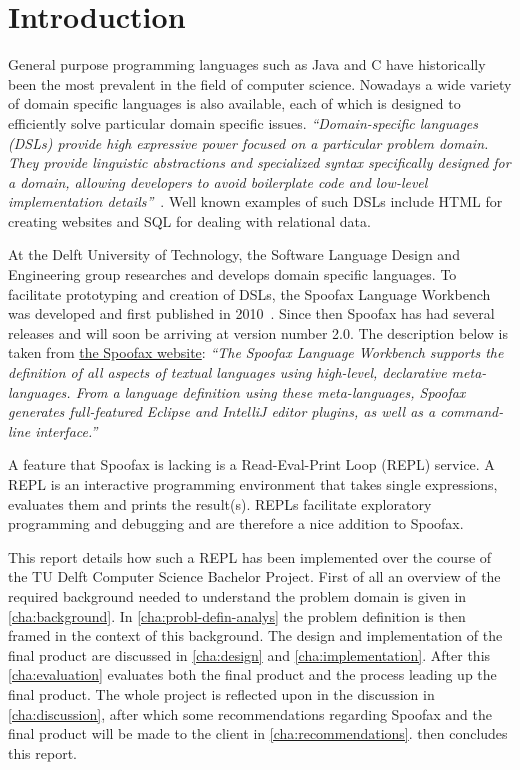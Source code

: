 \chapter{Introduction}
\label{cha:introduction}

General purpose programming languages such as Java and C have historically been
the most prevalent in the field of computer science. Nowadays a wide variety of
domain specific languages is also available, each of which is designed to
efficiently solve particular domain specific issues. \textit{``Domain-specific
languages (DSLs) provide high expressive power focused on a particular problem
domain. They provide linguistic abstractions and specialized syntax
specifically designed for a domain, allowing developers to avoid boilerplate
code and low-level implementation details''}~\cite{Kats10a}. Well known
examples of such DSLs include HTML for creating websites and SQL for dealing
with relational data.

At the Delft University of Technology, the Software Language Design and
Engineering group researches and develops domain specific languages. To
facilitate prototyping and creation of DSLs, the Spoofax Language Workbench was
developed and first published in 2010~\cite{Kats10a}. Since then Spoofax has had
several releases and will soon be arriving at version number 2.0. The
description below is taken from \href{http://spoofax.org}{the Spoofax website}:
\textit{``The Spoofax Language Workbench supports the definition of all aspects
of textual languages using high-level, declarative meta-languages. From a
language definition using these meta-languages, Spoofax generates full-featured
Eclipse and IntelliJ editor plugins, as well as a command-line interface.''}

A feature that Spoofax is lacking is a Read-Eval-Print Loop (REPL) service. A
REPL is an interactive programming environment that takes single expressions,
evaluates them and prints the result(s). REPLs facilitate exploratory
programming and debugging and are therefore a nice addition to Spoofax.

This report details how such a REPL has been implemented over the course of the
TU Delft Computer Science Bachelor Project. First of all an overview of the
required background needed to understand the problem domain is given in
\cref{cha:background}. In \cref{cha:probl-defin-analys} the problem definition
is then framed in the context of this background. The design and implementation
of the final product are discussed in \cref{cha:design} and
\cref{cha:implementation}. After this \cref{cha:evaluation} evaluates both the
final product and the process leading up the final product. The whole
project is reflected upon in the discussion in \cref{cha:discussion}, after
which some recommendations regarding Spoofax and the final product will be made
to the client in \cref{cha:recommendations}.  then
concludes this report.

